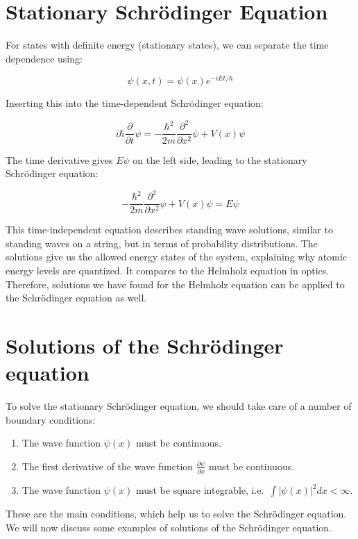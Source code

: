 \documentclass[
  a4paper,
]{book}
\providecommand{\tightlist}{%
  \setlength{\itemsep}{0pt}\setlength{\parskip}{0pt}}
\begin{document}
\section{Stationary Schrödinger
Equation}\label{stationary-schruxf6dinger-equation}

For states with definite energy (stationary states), we can separate the
time dependence using:

\[\psi(x,t) = \psi(x)e^{-iEt/\hbar}\]

Inserting this into the time-dependent Schrödinger equation:

\[i\hbar\frac{\partial}{\partial t}\psi = -\frac{\hbar^2}{2m}\frac{\partial^2}{\partial x^2}\psi + V(x)\psi\]

The time derivative gives \(E\psi\) on the left side, leading to the
stationary Schrödinger equation:

\[-\frac{\hbar^2}{2m}\frac{\partial^2}{\partial x^2}\psi + V(x)\psi = E\psi\]

This time-independent equation describes standing wave solutions,
similar to standing waves on a string, but in terms of probability
distributions. The solutions give us the allowed energy states of the
system, explaining why atomic energy levels are quantized. It compares
to the Helmholz equation in optics. Therefore, solutions we have found
for the Helmholz equation can be applied to the Schrödinger equation as
well.

\section{Solutions of the Schrödinger
equation}\label{solutions-of-the-schruxf6dinger-equation}

To solve the stationary Schrödinger equation, we should take care of a
number of boundary conditions:

\begin{enumerate}
\def\labelenumi{\arabic{enumi}.}
\tightlist
\item
  The wave function \(\psi(x)\) must be continuous.
\item
  The first derivative of the wave function
  \(\frac{\partial \psi}{\partial x}\) must be continuous.
\item
  The wave function \(\psi(x)\) must be square integrable,
  i.e.~\(\int |\psi(x)|^2 dx < \infty\).
\end{enumerate}

These are the main conditions, which help us to solve the Schrödinger
equation. We will now discuss some examples of solutions of the
Schrödinger equation.
\end{document}

